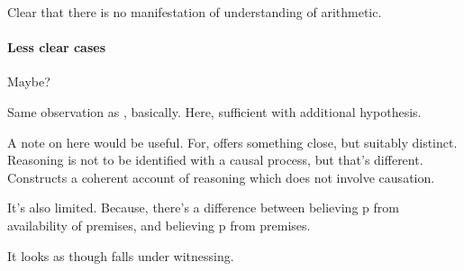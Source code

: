 \begin{note}[Illustration]
  Clear that there is no manifestation of understanding of arithmetic.
\end{note}

\paragraph*{Less clear cases}

\begin{note}[Valaris]
  Maybe?

  Same observation as \citeauthor{Wedgwood:2006ui}, basically.
  Here, sufficient with additional hypothesis.
\end{note}

\begin{note}
  A note on \citeauthor{Valaris:2014un} here would be useful.
  For, \citeauthor{Valaris:2014un} offers something close, but suitably distinct.
  Reasoning is not to be identified with a causal process, but that's different.
  Constructs a coherent account of reasoning which does not involve causation.

  It's also limited.
  Because, there's a difference between believing p from availability of premises, and believing p from premises.

  It looks as though \citeauthor{Valaris:2014un} falls under witnessing.
\end{note}

